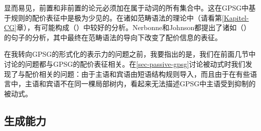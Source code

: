 \zl
显而易见，前置和非前置的论元必须加在属于动词的所有集合中。这在GPSG中基于规则的配价表征中是极为少见的。在诸如范畴语法的理论中（请看第\ref{Kapitel-CG}章），有可能构成（）中较好的分析\citep{Geach70a}。Nerbonne和Johnson都提出了诸如（）的句子的分析，其中最终在范畴语法的导向下改变了配价信息的表征。

在我转向GPSG的形式化的表示力的问题之前，我要指出的是，我们在前面几节中讨论的问题都与GPSG的配价表征相关。在\ref{sec-passive-gpsg}讨论被动式时我们发现了与配价相关的问题：由于主语和宾语由短语结构规则导入，而且由于在有些语言中，主语和宾语不在同一棵局部树内，看起来无法描述GPSG中主语受到抑制的被动式。

\subsection{生成能力}


